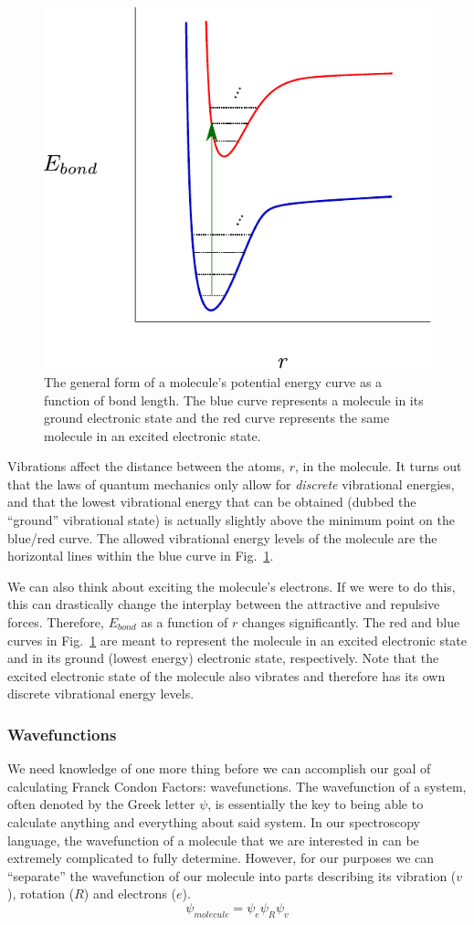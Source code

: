 \documentclass[12pt]{article}
\begin{document}
\begin{figure}
    \begin{center}
        \includegraphics[width=0.4\linewidth]{figures/potential_energy_curve.pdf}
    \end{center}
    \caption{
    The general form of a molecule's potential energy curve as a function of bond length. The blue curve represents a molecule in its ground electronic state and the red curve represents the same molecule in an excited electronic state.
    }
    \label{fig:potential_curve}
\end{figure}

Vibrations affect the distance between the atoms, $r$, in the molecule. It turns out that the laws of quantum mechanics only allow for \textit{discrete} vibrational energies, and that the lowest vibrational energy that can be obtained (dubbed the ``ground'' vibrational state) is actually slightly above the minimum point on the blue/red curve. The allowed vibrational energy levels of the molecule are the horizontal lines within the blue curve in Fig.~\ref{fig:potential_curve}.

We can also think about exciting the molecule's electrons. If we were to do this, this can drastically change the interplay between the attractive and repulsive forces. Therefore, $E_{bond}$ as a function of $r$ changes significantly. The red and blue curves in Fig.~\ref{fig:potential_curve} are meant to represent the molecule in an excited electronic state and in its ground (lowest energy) electronic state, respectively. Note that the excited electronic state of the molecule also vibrates and therefore has its own discrete vibrational energy levels.

\subsubsection{Wavefunctions}

We need knowledge of one more thing before we can accomplish our goal of calculating Franck Condon Factors: wavefunctions. The wavefunction of a system, often denoted by the Greek letter $\psi$, is essentially the key to being able to calculate anything and everything about said system. In our spectroscopy language, the wavefunction of a molecule that we are interested in can be extremely complicated to fully determine. However, for our purposes we can ``separate'' the wavefunction of our molecule into parts describing its vibration ($v$), rotation ($R$) and electrons ($e$).
\begin{equation}
    \psi_{molecule} = \psi_e\psi_R\psi_v
\end{equation}
\end{document}
